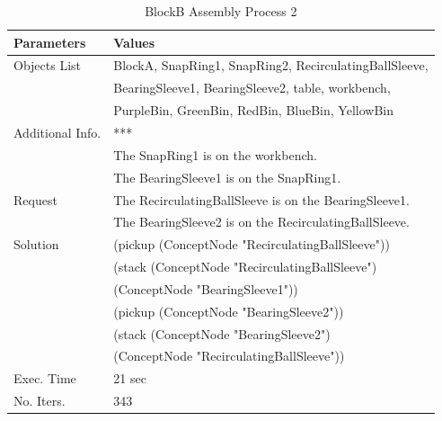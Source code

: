 \begin{table}[htbp]
  \centering
  \caption{BlockB Assembly Process 2}\label{tab:ass_B_2}
  \medskip
\begin{tabular}{ll}
\toprule
\textbf{Parameters} &  \textbf{Values}  \\
\midrule
\rowcolor{gray!25}
Objects List &  BlockA, SnapRing1, SnapRing2, RecirculatingBallSleeve, \\
\rowcolor{gray!25}
& BearingSleeve1, BearingSleeve2, table, workbench, \\
\rowcolor{gray!25}
&  PurpleBin, GreenBin, RedBin, BlueBin, YellowBin \\
Additional Info. & *** \\
& The SnapRing1 is on the workbench. \\
& The BearingSleeve1 is on the SnapRing1. \\
\rowcolor{gray!25}
Request & The RecirculatingBallSleeve is on the BearingSleeve1. \\
& The BearingSleeve2 is on the RecirculatingBallSleeve. \\
Solution & (pickup (ConceptNode "RecirculatingBallSleeve")) \\
& (stack (ConceptNode "RecirculatingBallSleeve") \\
& \quad\quad\quad(ConceptNode "BearingSleeve1")) \\
& (pickup (ConceptNode "BearingSleeve2")) \\
& (stack (ConceptNode "BearingSleeve2") \\
& \quad\quad\quad(ConceptNode "RecirculatingBallSleeve")) \\
\rowcolor{gray!25}
Exec. Time & 21 sec \\
No. Iters. & 343 \\	
\bottomrule
\end{tabular}
\end{table}

